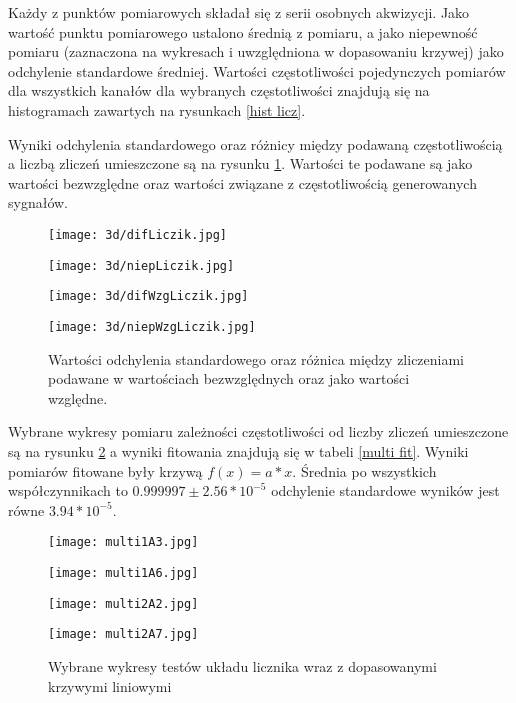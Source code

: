Każdy z punktów pomiarowych składał się z serii osobnych akwizycji. Jako wartość punktu pomiarowego ustalono średnią z pomiaru, a jako niepewność pomiaru (zaznaczona na wykresach i uwzględniona w dopasowaniu krzywej) jako odchylenie standardowe średniej. Wartości częstotliwości pojedynczych pomiarów dla wszystkich kanałów dla wybranych częstotliwości znajdują się na histogramach zawartych na rysunkach \ref{hist licz}. 

Wyniki odchylenia standardowego oraz różnicy między podawaną częstotliwością a liczbą zliczeń umieszczone są na rysunku \ref{3d licznik}. Wartości te podawane są jako wartości bezwzględne oraz wartości związane z częstotliwością generowanych sygnałów.

\begin{figure}
        \centering
        \begin{multicols}{2}
                \texttt{[image: 3d/difLiczik.jpg]} \par                
                \texttt{[image: 3d/niepLiczik.jpg]} \par                
        \end{multicols} \hfill
        \begin{multicols}{2}
                \texttt{[image: 3d/difWzgLiczik.jpg]} \par                
                \texttt{[image: 3d/niepWzgLiczik.jpg]} \par                
        \end{multicols}
        \caption{Wartości odchylenia standardowego oraz różnica między zliczeniami podawane w wartościach bezwzględnych oraz jako wartości względne. }
        \label{3d licznik}
\end{figure}

Wybrane wykresy pomiaru zależności częstotliwości od liczby zliczeń umieszczone są na rysunku \ref{multi wyk} a wyniki fitowania znajdują się w tabeli \ref{multi fit}. Wyniki pomiarów fitowane były krzywą $f(x) = a*x$. 
Średnia po wszystkich współczynnikach to $0.999997 \pm 2.56*10^{-5}$
odchylenie standardowe wyników jest równe  $3.94 * 10^{-5}$.

\begin{figure}
        \centering
        \begin{multicols}{2}
                \texttt{[image: multi1A3.jpg]} \par
                \texttt{[image: multi1A6.jpg]} \par                
        \end{multicols} \hfill
        \begin{multicols}{2}
                \texttt{[image: multi2A2.jpg]} \par
                \texttt{[image: multi2A7.jpg]} \par                
        \end{multicols}
        \caption{Wybrane wykresy testów układu licznika wraz z dopasowanymi krzywymi liniowymi}
        \label{multi wyk}
\end{figure}

